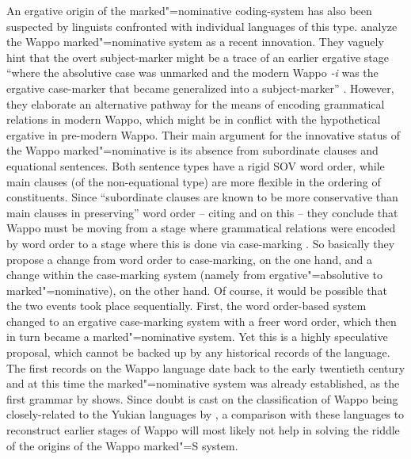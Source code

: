 An ergative origin of the marked"=nominative coding-system has also been suspected by linguists confronted with individual languages of this type. 
\citet{Lietal:1977} analyze the Wappo marked"=nominative system as a recent innovation. 
They vaguely hint that the overt subject-marker might be a trace of an earlier ergative stage ``where the absolutive case was unmarked and the modern Wappo \emph{-i} was the ergative case-marker that became generalized into a subject-marker'' \citep[98]{Lietal:1977}. 
However, they elaborate an alternative pathway for the means of encoding grammatical relations in modern Wappo, which might be in conflict with the hypothetical ergative in pre-modern Wappo. 
Their main argument for the innovative status of the Wappo marked"=nominative is its absence from subordinate clauses and equational sentences. 
Both sentence types have a rigid SOV word order, while main clauses (of the non-equational type) are more flexible in the ordering of constituents. 
Since ``subordinate clauses are known to be more conservative than main clauses in preserving'' word order -- citing \citet{Lehmann:1974} and \citet{Vennemann:1975} on this -- they conclude that Wappo must be moving from a stage where grammatical relations were encoded by word order to a stage where this is done via case-marking \citep[100]{Lietal:1977}. 
So basically they propose a change from word order to case-marking, on the one hand, and a change within the case-marking system (namely from ergative"=absolutive to marked"=nominative), on the other hand. 
Of course, it would be possible that the two events took place sequentially. 
First, the word order-based system changed to an ergative case-marking system with a freer word order, which then in turn became a marked"=nominative system. 
Yet this is a highly speculative proposal, which cannot be backed up by any historical records of the language. 
The first records on the Wappo language date back to the early twentieth century and at this time the marked"=nominative system was already established, as the first grammar by \citet[131]{Radin:1929} shows. 
Since doubt is cast on the classification of Wappo being closely-related to the Yukian languages by \citet{Sawyer:1980}, a comparison with these languages to reconstruct earlier stages of Wappo will most likely not help in solving the riddle of the origins of the Wappo marked"=S system. 

